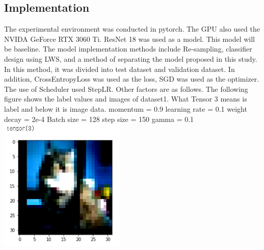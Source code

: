 \documentclass[extendedabs]{bmvc2k}
\begin{document}
  \subsection{Implementation}
  \quad The experimental environment was conducted in pytorch. The GPU also used the NVIDA GeForce RTX 3060 Ti. ResNet 18 was used as a model. 
  This model will be baseline. The model implementation methods include Re-sampling, classifier design using LWS, and a method of separating the model proposed in this study.
  In this method, it was divided into test dataset and validation dataset. In addition, CrossEntropyLoss was used as the loss, SGD was used as the optimizer.
  The use of Scheduler used StepLR. Other factors are as follows.
  The following figure shows the label values and images of dataset1. What Tensor 3 means is label and below it is image data.
  \newline momentum = 0.9
  \newline learning rate = 0.1 
  \newline weight decay = 2e-4
  \newline Batch size = 128
  \newline step size = 150
  \newline gamma = 0.1
  \newline  \includegraphics[width=6cm]{images/11_project.PNG}
\end{document}
